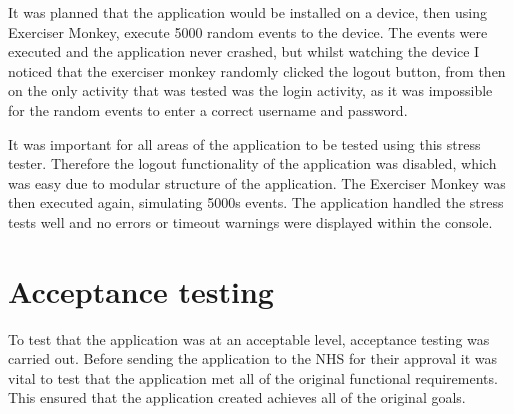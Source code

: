 It was planned that the application would be installed on a device, then using Exerciser Monkey, execute 5000 random events to the device. The events were executed and the application never crashed, but whilst watching the device I noticed that the exerciser monkey randomly clicked the logout button, from then on the only activity that was tested was the login activity, as it was impossible for the random events to enter a correct username and password. 

It was important for all areas of the application to be tested using this stress tester. Therefore the logout functionality of the application was disabled, which was easy due to modular structure of the application. The Exerciser Monkey was then executed again, simulating 5000s events. The application handled the stress tests well and no errors or timeout warnings were displayed within the console.


\section{Acceptance testing}

To test that the application was at an acceptable level, acceptance testing was carried out. Before sending the application to the NHS for their approval it was vital to test that the application met all of the original functional requirements. This ensured that the application created achieves all of the original goals.

